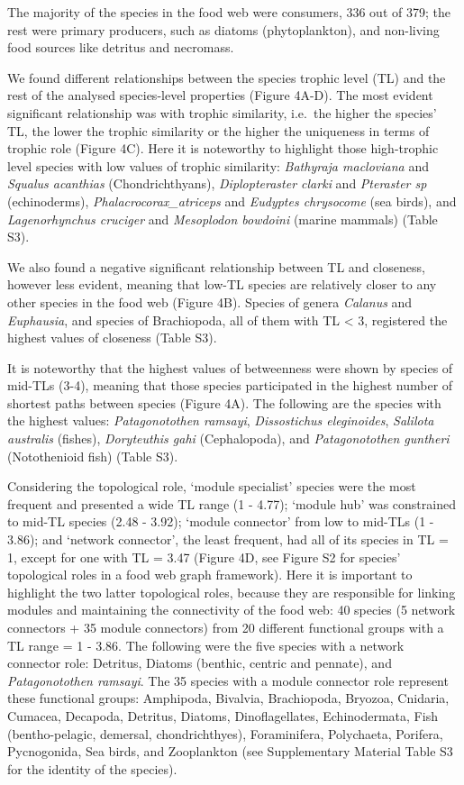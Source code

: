 \documentclass[preprint, 3p,
authoryear]{elsarticle} %
\begin{document}
The majority of the species in the food web were consumers, 336 out of
379; the rest were primary producers, such as diatoms (phytoplankton),
and non-living food sources like detritus and necromass.

We found different relationships between the species trophic level (TL)
and the rest of the analysed species-level properties (Figure 4A-D). The
most evident significant relationship was with trophic similarity,
i.e.~the higher the species' TL, the lower the trophic similarity or the
higher the uniqueness in terms of trophic role (Figure 4C). Here it is
noteworthy to highlight those high-trophic level species with low values
of trophic similarity: \emph{Bathyraja macloviana} and \emph{Squalus
acanthias} (Chondrichthyans), \emph{Diplopteraster clarki} and
\emph{Pteraster sp} (echinoderms), \emph{Phalacrocorax\_atriceps} and
\emph{Eudyptes chrysocome} (sea birds), and \emph{Lagenorhynchus
cruciger} and \emph{Mesoplodon bowdoini} (marine mammals) (Table S3).

We also found a negative significant relationship between TL and
closeness, however less evident, meaning that low-TL species are
relatively closer to any other species in the food web (Figure 4B).
Species of genera \emph{Calanus} and \emph{Euphausia}, and species of
Brachiopoda, all of them with TL \textless{} 3, registered the highest
values of closeness (Table S3).

It is noteworthy that the highest values of betweenness were shown by
species of mid-TLs (3-4), meaning that those species participated in the
highest number of shortest paths between species (Figure 4A). The
following are the species with the highest values: \emph{Patagonotothen
ramsayi}, \emph{Dissostichus eleginoides}, \emph{Salilota australis}
(fishes), \emph{Doryteuthis gahi} (Cephalopoda), and
\emph{Patagonotothen guntheri} (Notothenioid fish) (Table S3).

Considering the topological role, `module specialist' species were the
most frequent and presented a wide TL range (1 - 4.77); `module hub' was
constrained to mid-TL species (2.48 - 3.92); `module connector' from low
to mid-TLs (1 - 3.86); and `network connector', the least frequent, had
all of its species in TL = 1, except for one with TL = 3.47 (Figure 4D,
see Figure S2 for species' topological roles in a food web graph
framework). Here it is important to highlight the two latter topological
roles, because they are responsible for linking modules and maintaining
the connectivity of the food web: 40 species (5 network connectors + 35
module connectors) from 20 different functional groups with a TL range =
1 - 3.86. The following were the five species with a network connector
role: Detritus, Diatoms (benthic, centric and pennate), and
\emph{Patagonotothen ramsayi}. The 35 species with a module connector
role represent these functional groups: Amphipoda, Bivalvia,
Brachiopoda, Bryozoa, Cnidaria, Cumacea, Decapoda, Detritus, Diatoms,
Dinoflagellates, Echinodermata, Fish (bentho-pelagic, demersal,
chondrichthyes), Foraminifera, Polychaeta, Porifera, Pycnogonida, Sea
birds, and Zooplankton (see Supplementary Material Table S3 for the
identity of the species).
\end{document}
